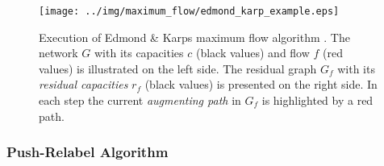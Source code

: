 \begin{figure}
\centering
\texttt{[image: ../img/maximum\_flow/edmond\_karp\_example.eps]}
\caption{Execution of Edmond \& Karps maximum flow algorithm \cite{edmonds1972theoretical}.
         The network $G$ with its capacities $c$ (black values) and flow $f$ (red values) is illustrated
         on the left side. The residual graph $G_f$ with its \emph{residual capacities} $r_f$ (black values)
         is presented on the right side. In each step the current \emph{augmenting path} in $G_f$ is highlighted
         by a red path. }
\label{img:edmond_karp_example}
\end{figure}

\subsubsection{Push-Relabel Algorithm}
\label{sec:push_relabel}

